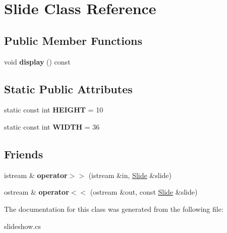 \hypertarget{class_slide}{\section{\-Slide \-Class \-Reference}
\label{class_slide}
}
\subsection*{\-Public \-Member \-Functions}
\begin{DoxyCompactItemize}
\item 
\hypertarget{class_slide_a9806a219f41cc4f1c52cfaf661a51fdc}{void {\bfseries display} () const }\label{class_slide_a9806a219f41cc4f1c52cfaf661a51fdc}

\end{DoxyCompactItemize}
\subsection*{\-Static \-Public \-Attributes}
\begin{DoxyCompactItemize}
\item 
\hypertarget{class_slide_a8868b2bbde9c70ce1445c6f0a023dfe1}{static const int {\bfseries \-H\-E\-I\-G\-H\-T} = 10}\label{class_slide_a8868b2bbde9c70ce1445c6f0a023dfe1}

\item 
\hypertarget{class_slide_a31a9192dd47b8ef7a7d284b09025e5c4}{static const int {\bfseries \-W\-I\-D\-T\-H} = 36}\label{class_slide_a31a9192dd47b8ef7a7d284b09025e5c4}

\end{DoxyCompactItemize}
\subsection*{\-Friends}
\begin{DoxyCompactItemize}
\item 
\hypertarget{class_slide_aec586de7d833c11a556f952eeb395f9c}{istream \& {\bfseries operator$>$$>$} (istream \&in, \hyperlink{class_slide}{\-Slide} \&slide)}\label{class_slide_aec586de7d833c11a556f952eeb395f9c}

\item 
\hypertarget{class_slide_acdff51cd2fbb90d34d988a99a43cffec}{ostream \& {\bfseries operator$<$$<$} (ostream \&out, const \hyperlink{class_slide}{\-Slide} \&slide)}\label{class_slide_acdff51cd2fbb90d34d988a99a43cffec}

\end{DoxyCompactItemize}


\-The documentation for this class was generated from the following file\-:\begin{DoxyCompactItemize}
\item 
slideshow.\-cs\end{DoxyCompactItemize}
